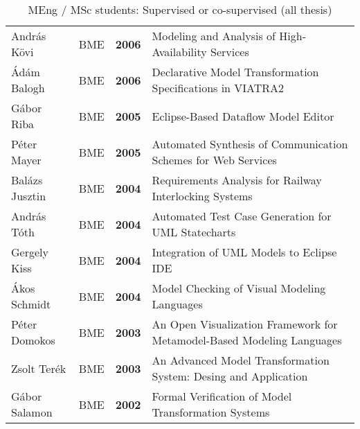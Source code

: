 \begin{table}[h!]
\begin{tabular}{@{}lllp{11cm}@{}}
Andr\'as K\"ovi & BME  & \textbf{2006} & Modeling and Analysis of High-Availability Services \\ 
\'Ad\'am Balogh & BME & \textbf{2006} & Declarative Model Transformation Specifications in VIATRA2\\ 
G\'abor Riba & BME & \textbf{2005} & Eclipse-Based Dataflow Model Editor \\ 
P\'eter Mayer & BME  & \textbf{2005} & Automated Synthesis of Communication Schemes for Web Services \\ 
Bal\'azs Jusztin & BME & \textbf{2004} & Requirements Analysis for Railway Interlocking Systems\\ 
Andr\'as T\'oth & BME & \textbf{2004} & Automated Test Case Generation for UML Statecharts\\ 
Gergely Kiss & BME & \textbf{2004} & Integration of UML Models to Eclipse IDE\\ 
\'Akos Schmidt & BME & \textbf{2004} & Model Checking of Visual Modeling Languages\\ 
P\'eter Domokos & BME & \textbf{2003} & An Open Visualization Framework for Metamodel-Based Modeling Languages\\ 
Zsolt Ter\'ek & BME & \textbf{2003} & An Advanced Model Transformation System: Desing and Application\\ 
G\'abor Salamon & BME & \textbf{2002} & Formal Verification of Model Transformation Systems\\ 
\bottomrule
\end{tabular}
\caption{MEng / MSc students: Supervised or co-supervised (all thesis)}
\label{tab:msc-supervised}
\end{table}


